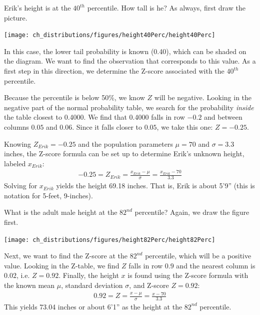\begin{examplewrap}
\begin{nexample}{Erik's height is at the $40^{th}$ percentile. How tall is he?}\label{normalExam40Perc}
As always, first draw the picture.\vspace{-1mm}
\begin{center}
\texttt{[image: ch\_distributions/figures/height40Perc/height40Perc]}\vspace{-1mm}
\end{center}
In this case, the lower tail probability is known (0.40), which can be shaded on the diagram. We want to find the observation that corresponds to this value. As a first step in this direction, we determine the Z-score associated with the $40^{th}$ percentile.

Because the percentile is below 50\%, we know $Z$ will be negative. Looking in the negative part of the normal probability table, we search for the probability \emph{inside} the table closest to 0.4000. We find that 0.4000 falls in row $-0.2$ and between columns $0.05$ and $0.06$. Since it falls closer to $0.05$, we take this one: $Z=-0.25$.

Knowing $Z_{Erik}=-0.25$ and the population parameters $\mu=70$ and $\sigma=3.3$ inches, the Z-score formula can be set up to determine Erik's unknown height, labeled $x_{Erik}$:
\begin{eqnarray*}
-0.25 = Z_{Erik} = \frac{x_{Erik} - \mu}{\sigma} = \frac{x_{Erik} - 70}{3.3}
\end{eqnarray*}
Solving for $x_{Erik}$ yields the height 69.18 inches. That is, Erik is about 5'9'' (this is notation for 5-feet, 9-inches).
\end{nexample}
\end{examplewrap}

\begin{examplewrap}
\begin{nexample}{What is the adult male height at the $82^{nd}$ percentile?}
Again, we draw the figure first.%
\begin{center}
\texttt{[image: ch\_distributions/figures/height82Perc/height82Perc]}%
\end{center}
Next, we want to find the Z-score at the $82^{nd}$ percentile, which will be a positive value. Looking in the Z-table, we find $Z$ falls in row $0.9$ and the nearest column is $0.02$, i.e. $Z=0.92$. Finally, the height $x$ is found using the Z-score formula with the known mean $\mu$, standard deviation $\sigma$, and Z-score $Z=0.92$:
\begin{eqnarray*}
0.92 = Z = \frac{x-\mu}{\sigma} = \frac{x - 70}{3.3}
\end{eqnarray*}
This yields 73.04 inches or about 6'1'' as the height at the $82^{nd}$ percentile.
\end{nexample}
\end{examplewrap}

